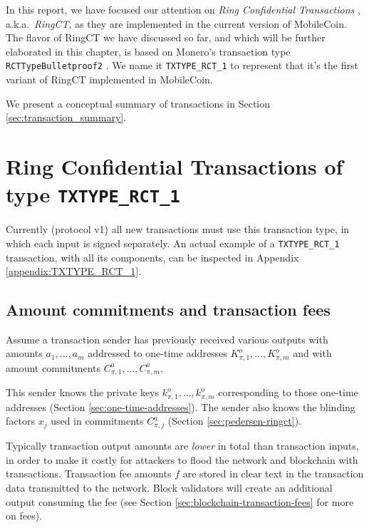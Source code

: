 In this report, we have focused our attention on {\em Ring Confidential Transactions} \cite{MRL-0005-ringct}, a.k.a.\ {\em RingCT}, as they are implemented in the current version of MobileCoin. The flavor of RingCT we have discussed so far, and which will be further elaborated in this chapter, is based on Monero's transaction type {\tt RCTTypeBulletproof2} \cite{ztm-2}. We name it {\tt TXTYPE\_RCT\_1} to represent that it's the first variant of RingCT implemented in MobileCoin.

We present a conceptual summary of transactions in Section \ref{sec:transaction_summary}.



\section{Ring Confidential Transactions of type {\tt TXTYPE\_RCT\_1}}
\label{sec:RCT-transactions}

Currently (protocol v1) all new transactions must use this transaction type, in which each input is signed separately. An actual example of a {\tt TXTYPE\_RCT\_1} transaction, with all its components, can be inspected in Appendix \ref{appendix:TXTYPE_RCT_1}.


\subsection{Amount commitments and transaction fees}
\label{sec:commitments-and-fees}

Assume a transaction sender has previously received various outputs with amounts $a_1, ..., a_m$ addressed to one-time addresses $K^o_{\pi,1}, ..., K^o_{\pi,m}$ and with amount commitments $C^a_{\pi,1}, ..., C^a_{\pi,m}$.

This sender knows the private keys $k^o_{\pi,1}, ..., k^o_{\pi,m}$ corresponding to those one-time addresses (Section \ref{sec:one-time-addresses}). The sender also knows the blinding factors $x_j$ used in commitments $C^a_{\pi,j}$ (Section \ref{sec:pedersen-ringct}).

Typically transaction output amounts are {\em lower} in total than transaction inputs, in order to make it costly for attackers to flood the network and blockchain with transactions. Transaction fee amounts $f$ are stored in clear text in the transaction data transmitted to the network. Block validators will create an additional output consuming the fee (see Section \ref{sec:blockchain-transaction-fees} for more on fees).

